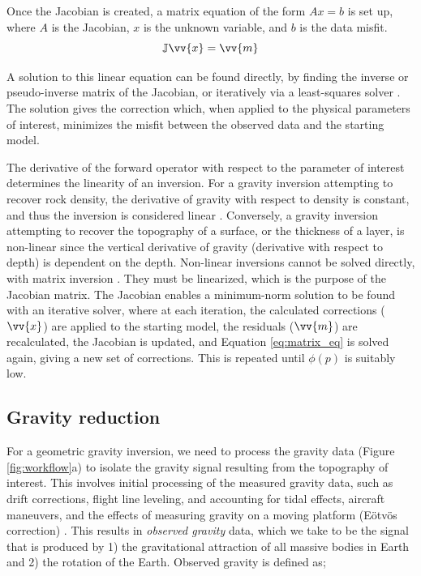 \documentclass[tc, manuscript]{copernicus}
\begin{document}
Once the Jacobian is created, a matrix equation of the form $Ax=b$ is set up, where $A$ is the Jacobian, $x$ is the unknown variable, and $b$ is the data misfit.
\begin{equation} \label{eq:matrix_eq}
    \mathbb{J} \vv{x} = \vv{m}
\end{equation}

A solution to this linear equation can be found directly, by finding the inverse or pseudo-inverse matrix of the Jacobian, or iteratively via a least-squares solver \citep{jacobygravity2009}. The solution gives the correction which, when applied to the physical parameters of interest, minimizes the misfit between the observed data and the starting model.

The derivative of the forward operator with respect to the parameter of interest determines the linearity of an inversion. For a gravity inversion attempting to recover rock density, the derivative of gravity with respect to density is constant, and thus the inversion is considered linear \citep{asterparameter2018}. Conversely, a gravity inversion attempting to recover the topography of a surface, or the thickness of a layer, is non-linear since the vertical derivative of gravity (derivative with respect to depth) is dependent on the depth. Non-linear inversions cannot be solved directly, with matrix inversion \citep{jacobygravity2009}. They must be linearized, which is the purpose of the Jacobian matrix. The Jacobian enables a minimum-norm solution to be found with an iterative solver, where at each iteration, the calculated corrections ($\vv{x}$) are applied to the starting model, the residuals ($\vv{m}$) are recalculated, the Jacobian is updated, and Equation \ref{eq:matrix_eq} is solved again, giving a new set of corrections. This is repeated until $\phi(p)$ is suitably low.

\subsection{Gravity reduction}\label{app:reduction}
For a geometric gravity inversion, we need to process the gravity data (Figure \ref{fig:workflow}a) to isolate the gravity signal resulting from the topography of interest. This involves initial processing of the measured gravity data, such as drift corrections, flight line leveling, and accounting for tidal effects, aircraft maneuvers, and the effects of measuring gravity on a moving platform (E\"{o}tv\"{o}s correction) \citep{hinzenew2005, hinzegravity2013}. This results in \textit{observed gravity} data, which we take to be the signal that is produced by 1) the gravitational attraction of all massive bodies in Earth and 2) the rotation of the Earth. Observed gravity is defined as;
\end{document}
